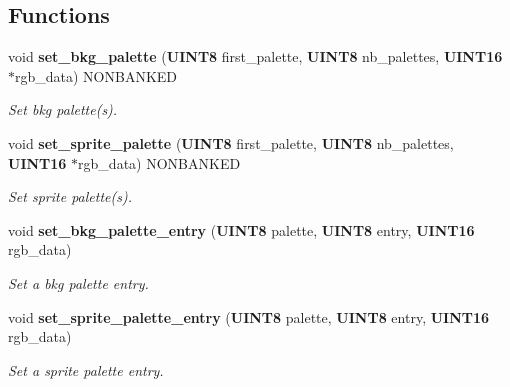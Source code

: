 \subsection*{Functions}
\begin{CompactItemize}
\item 
\label{cgb.h_a21}
void {\bf set\_\-bkg\_\-palette} ({\bf UINT8} first\_\-palette, {\bf UINT8} nb\_\-palettes, {\bf UINT16} $\ast$rgb\_\-data) NONBANKED
\begin{CompactList}\small\item\em Set bkg palette(s).\item\end{CompactList}

\item 
\label{cgb.h_a22}
void {\bf set\_\-sprite\_\-palette} ({\bf UINT8} first\_\-palette, {\bf UINT8} nb\_\-palettes, {\bf UINT16} $\ast$rgb\_\-data) NONBANKED
\begin{CompactList}\small\item\em Set sprite palette(s).\item\end{CompactList}

\item 
\label{cgb.h_a23}
void {\bf set\_\-bkg\_\-palette\_\-entry} ({\bf UINT8} palette, {\bf UINT8} entry, {\bf UINT16} rgb\_\-data)
\begin{CompactList}\small\item\em Set a bkg palette entry.\item\end{CompactList}

\item 
\label{cgb.h_a24}
void {\bf set\_\-sprite\_\-palette\_\-entry} ({\bf UINT8} palette, {\bf UINT8} entry, {\bf UINT16} rgb\_\-data)
\begin{CompactList}\small\item\em Set a sprite palette entry.\item\end{CompactList}


\end{CompactItemize}
